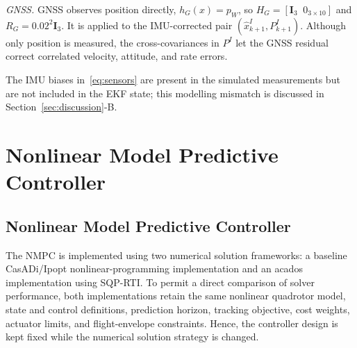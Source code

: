 \documentclass[conference]{IEEEtran}
\newcommand{\I}{\mathbf I}
\begin{document}
\textit{GNSS.} GNSS observes position directly, $h_G(x)=p_W$, so $H_G=[\I_3\;\;0_{3\times10}]$ and $R_G=0.02^2\I_3$. It is applied to the IMU-corrected pair $(\hat x^I_{k+1},P^I_{k+1})$. Although only position is measured, the cross-covariances in $P^I$ let the GNSS residual correct correlated velocity, attitude, and rate errors.

The IMU biases in~\eqref{eq:sensors} are present in the simulated measurements but are not included in the EKF state; this modelling mismatch is discussed in Section~\ref{sec:discussion}-B.

\section{Nonlinear Model Predictive Controller}
\subsection{Nonlinear Model Predictive Controller}
The NMPC is implemented using two numerical solution frameworks: a baseline CasADi/Ipopt nonlinear-programming implementation and an acados implementation using SQP-RTI. To permit a direct comparison of solver performance, both implementations retain the same nonlinear quadrotor model, state and control definitions, prediction horizon, tracking objective, cost weights, actuator limits, and flight-envelope constraints. Hence, the controller design is kept fixed while the numerical solution strategy is changed.
\end{document}
